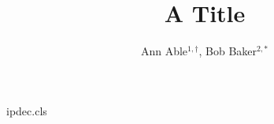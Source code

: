 \begin{filecontents*}[overwrite]{ipdec.cls}
\renewcommand{\author}[1]{{\raggedright #1\par}}
\newcommand{\affil}[1]{{\small\raggedright #1}}
\end{filecontents*}
\documentclass{ipdec}

\title{A Title}
\author{Ann Able$^{1,\dagger}$, Bob Baker$^{2,*}$}





\maketitle
Text.

